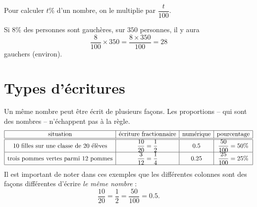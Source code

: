 \begin{Aretenir}
    Pour calculer \( t\%\) d'un nombre, on le multiplie par \( \dfrac{ t }{ 100 }\).
\end{Aretenir}

\begin{example}
    Si \( 8\%\) des personnes sont gauchères, sur \( 350\) personnes, il y aura
    \begin{equation}
        \frac{ 8 }{ 100 }\times 350=\frac{ 8\times 350 }{ 100 }=28
    \end{equation}
    gauchers (environ).
\end{example}

\section{Types d'écritures}

Un même nombre peut être écrit de plusieurs façons. Les proportions -- qui sont des nombres -- n'échappent pas à la règle.
\begin{equation*}
    \begin{array}[]{|c|c|c|c|}
        \hline
        \text{situation}&\text{écriture fractionnaire}&\text{numérique}&\text{pourcentage}\\
        \hline\hline
        \text{\( 10\) filles sur une classe de \( 20\) élèves}&\dfrac{ 10 }{ 20 }=\dfrac{ 1 }{2}&0.5&\dfrac{ 50 }{ 100 }=50\%\\
        \hline
        \text{trois pommes vertes parmi \( 12\) pommes}&\dfrac{ 3 }{ 12 }=\dfrac{1}{ 4 }&0.25&\dfrac{ 25 }{ 100 }=25\%\\
        \hline
    \end{array}
\end{equation*}
Il est important de noter dans ces exemples que les différentes colonnes sont des façons différentes d'écrire \emph{le même nombre} :
\begin{equation}
    \frac{ 10 }{ 20 }=\frac{ 1 }{2}=\frac{ 50 }{ 100 }=0.5.
\end{equation}

